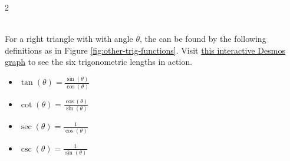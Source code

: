 \begin{multicols}{2}
	\begin{myDefinition}~\\[0.5mm]
		For a right triangle with with angle $\theta$, the  can be found by the following definitions as in Figure \ref{fig:other-trig-functions}. Visit \href{http://tiny.cc/six-trig-functions}{this interactive Desmos graph} to see the six trigonometric lengths in action. 
		\begin{itemize}
				\item $\tan(\theta)=\frac{\sin(\theta)}{\cos(\theta)}$
				\item $\cot(\theta)=\frac{\cos(\theta)}{\sin(\theta)}$
				\item $\sec(\theta)=\frac{1}{\cos(\theta)}$
				\item $\csc(\theta)=\frac{1}{\sin(\theta)}$
		\end{itemize}
	\end{myDefinition}


\end{multicols}

